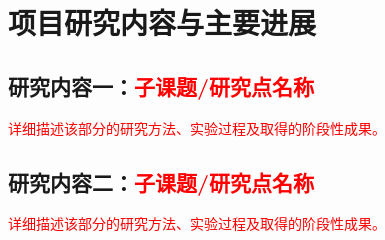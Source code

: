 \chapter{项目研究内容与主要进展}
\section{研究内容一：\textcolor{red}{子课题/研究点名称}}
\textcolor{red}{详细描述该部分的研究方法、实验过程及取得的阶段性成果。}

\section{研究内容二：\textcolor{red}{子课题/研究点名称}}
\textcolor{red}{详细描述该部分的研究方法、实验过程及取得的阶段性成果。}